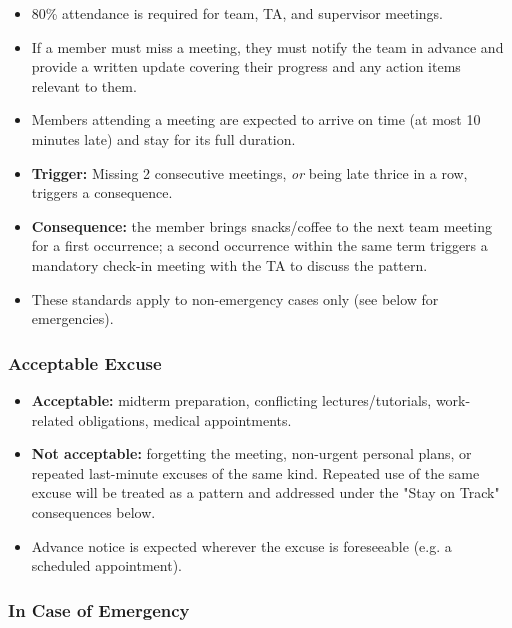 \documentclass{article}
\begin{document}
\begin{itemize}
    \item 80\% attendance is required for team, TA, and supervisor meetings.
    \item If a member must miss a meeting, they must notify the team in advance
          and provide a written update covering their progress and any action
          items relevant to them.
    \item Members attending a meeting are expected to arrive on time (at most
          10 minutes late) and stay for its full duration.
    \item \textbf{Trigger:} Missing 2 consecutive meetings, \emph{or} being late thrice in a row, triggers a consequence.
    \item \textbf{Consequence:} the member brings snacks/coffee to the next team meeting for a first occurrence; a second occurrence within the same term triggers a mandatory check-in meeting with the TA to discuss the pattern.
    \item These standards apply to non-emergency cases only (see below for
          emergencies).
\end{itemize}

\subsubsection*{Acceptable Excuse}


\begin{itemize}
    \item \textbf{Acceptable:} midterm preparation, conflicting lectures/tutorials, work-related obligations, medical appointments.
    \item \textbf{Not acceptable:} forgetting the meeting, non-urgent personal plans, or repeated last-minute excuses of the same kind. Repeated use of the same excuse will be treated as a pattern and addressed under the "Stay on Track" consequences below.
    \item Advance notice is expected wherever the excuse is foreseeable (e.g. a
          scheduled appointment).
\end{itemize}

\subsubsection*{In Case of Emergency}
\end{document}
